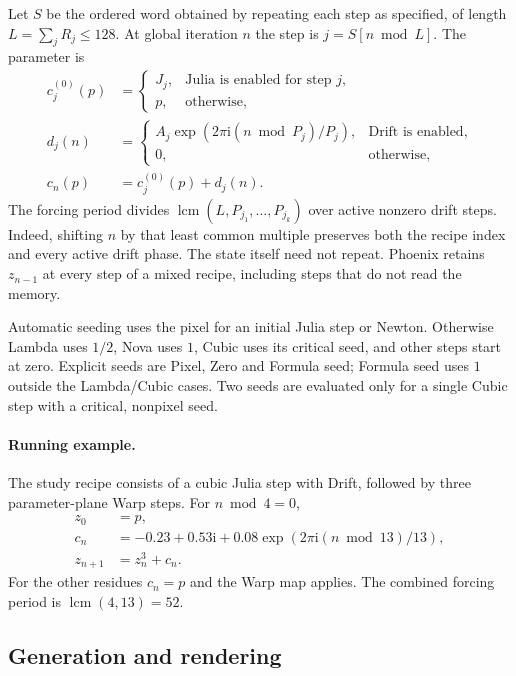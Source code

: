 \documentclass[11pt,a4paper]{article}
\numberwithin{equation}{section}
\newcommand{\ii}{\mathrm{i}}
\DeclareMathOperator{\lcm}{lcm}
\begin{document}
Let \(S\) be the ordered word obtained by repeating each step as
specified, of length \(L=\sum_j R_j\le128\). At global iteration \(n\)
the step is \(j=S[n\bmod L]\). The parameter is
\begin{align}
  c^{(0)}_j(p)&=
  \begin{cases}
    J_j, & \text{Julia is enabled for step }j,\\
    p,   & \text{otherwise},
  \end{cases}\\
  d_j(n)&=
  \begin{cases}
    A_j\exp(2\pi\ii(n\bmod P_j)/P_j), & \text{Drift is enabled},\\
    0, & \text{otherwise},
  \end{cases}\\
  c_n(p)&=c^{(0)}_j(p)+d_j(n). \label{eq:parameter}
\end{align}
The forcing period divides \(\lcm(L,P_{j_1},\ldots,P_{j_k})\) over active
nonzero drift steps. Indeed, shifting \(n\) by that least common multiple
preserves both the recipe index and every active drift phase. The state
itself need not repeat. Phoenix retains \(z_{n-1}\) at every step of a
mixed recipe, including steps that do not read the memory.

Automatic seeding uses the pixel for an initial Julia step or Newton.
Otherwise Lambda uses \(1/2\), Nova uses \(1\), Cubic uses its critical
seed, and other steps start at zero. Explicit seeds are Pixel, Zero and
Formula seed; Formula seed uses \(1\) outside the Lambda/Cubic cases.
Two seeds are evaluated only for a single Cubic step with a critical,
nonpixel seed.

\paragraph{Running example.}
The study recipe consists of a cubic Julia step with Drift, followed by
three parameter-plane Warp steps. For \(n\bmod4=0\),
\begin{align*}
  z_0&=p,\\
  c_n&=-0.23+0.53\ii+0.08\exp(2\pi\ii(n\bmod13)/13),\\
  z_{n+1}&=z_n^3+c_n.
\end{align*}
For the other residues \(c_n=p\) and the Warp map applies. The combined
forcing period is \(\lcm(4,13)=52\).

\subsection{Generation and rendering}
\end{document}
